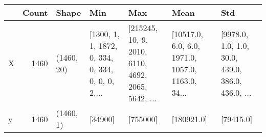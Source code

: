 \begin{tabular}{lrlllll}
\toprule
{} &  Count &       Shape &                                                Min &                                                Max &                                               Mean &                                                Std \\
\midrule
X &   1460 &  (1460, 20) &  [1300, 1, 1, 1872, 0, 334, 0, 334, 0, 0, 0, 2,... &  [215245, 10, 9, 2010, 6110, 4692, 2065, 5642, ... &  [10517.0, 6.0, 6.0, 1971.0, 1057.0, 1163.0, 34... &  [9978.0, 1.0, 1.0, 30.0, 439.0, 386.0, 436.0, ... \\
y &   1460 &   (1460, 1) &                                            [34900] &                                           [755000] &                                         [180921.0] &                                          [79415.0] \\
\bottomrule
\end{tabular}
